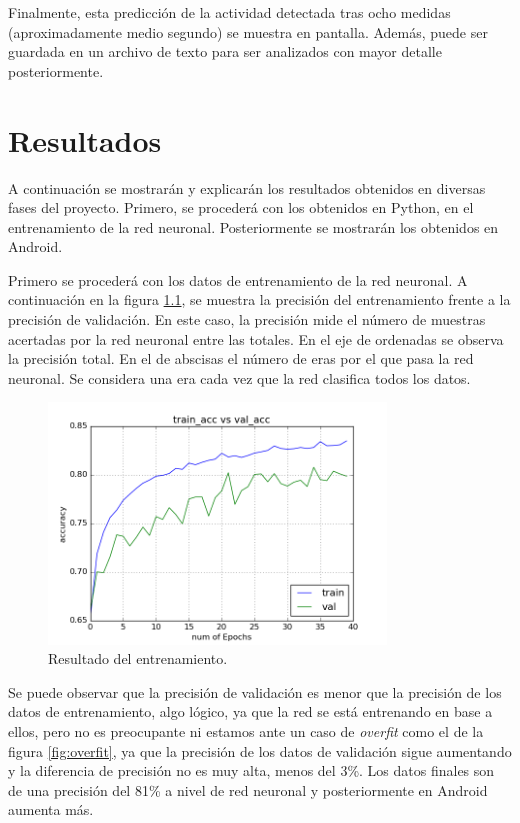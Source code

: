 \documentclass[12pt]{book}
\numberwithin{equation}{section}
\begin{document}
Finalmente, esta predicción de la actividad detectada tras ocho medidas (aproximadamente medio segundo) se muestra en pantalla. Además, puede ser guardada en un archivo de texto para ser analizados con mayor detalle posteriormente.

\newpage
\chapter{Resultados}

A continuación se mostrarán y explicarán los resultados obtenidos en diversas fases del proyecto. Primero, se procederá con los obtenidos en Python, en el entrenamiento de la red neuronal. Posteriormente se mostrarán los obtenidos en Android.

Primero se procederá con los datos de entrenamiento de la red neuronal. A continuación en la figura \ref{fig:possibleBF}, se muestra la precisión del entrenamiento frente a la precisión de validación. En este caso, la precisión mide el número de muestras acertadas por la red neuronal entre las totales. En el eje de ordenadas se observa la precisión total. En el de abscisas el número de eras por el que pasa la red neuronal. Se considera una era cada vez que la red clasifica todos los datos.

\begin{figure}[h]
    \centering
    \includegraphics[width=0.8\textwidth]{PossibleBF_2.png}
    \caption{Resultado del entrenamiento.}
    \label{fig:possibleBF}
\end{figure}

\newpage
Se puede observar que la precisión de validación es menor que la precisión de los datos de entrenamiento, algo lógico, ya que la red se está entrenando en base a ellos, pero no es preocupante ni estamos ante un caso de \textit{overfit} como el de la figura \ref{fig:overfit}, ya que la precisión de los datos de validación sigue aumentando y la diferencia de precisión no es muy alta, menos del 3\%. Los datos finales son de una precisión del 81\% a nivel de red neuronal y posteriormente en Android aumenta más.
\end{document}
